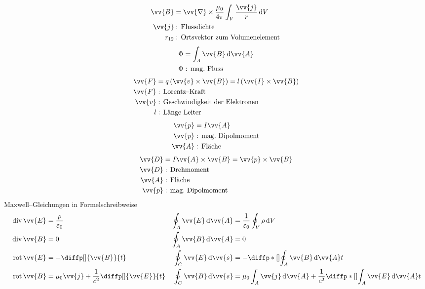 \documentclass[a4paper,12pt]{article}
\newcommand{\td}{\,\text{d}}
\numberwithin{equation}{section}
\begin{document}
\begin{align} 
        \vv{B}&=\vv{\nabla }\times \dfrac{\mu _0}{4\pi }\int_{V}^{}\dfrac{\vv{j}}{r}\td V\\
        \vv{j}&:\,\text{Flussdichte}\,\nonumber \\
        r_{12}&:\,\text{Ortsvektor zum Volumenelement}\,\nonumber 
\end{align} 
\begin{align} 
        \Phi &=\int_{A}^{}\vv{B}\td \vv{A}\\
        \Phi &:\,\text{mag.\ Fluss}\,\nonumber 
\end{align} 
\begin{align} 
        \vv{F}&=q\left(\vv{v}\times \vv{B}\right)=l\left(\vv{I}\times \vv{B}\right)\\
        \vv{F}&:\,\text{Lorentz--Kraft}\,\nonumber \\
        \vv{v}&:\,\text{Geschwindigkeit der Elektronen}\,\nonumber \\
        l&:\,\text{Länge Leiter}\,\nonumber 
\end{align} 
\begin{align} 
        \vv{p}&=I\vv{A}\\
        \vv{p}&:\,\text{mag.\ Dipolmoment}\,\nonumber \\
        \vv{A}&:\,\text{Fläche}\,\nonumber 
\end{align} 
\begin{align} 
        \vv{D}&=I\vv{A}\times \vv{B}=\vv{p}\times \vv{B}\\
        \vv{D}&:\,\text{Drehmoment}\,\nonumber \\
        \vv{A}&:\,\text{Fläche}\,\nonumber \\
        \vv{p}&:\,\text{mag.\ Dipolmoment}\,\nonumber 
\end{align} 
Maxwell--Gleichungen in Formelschreibweise
\begin{align} 
        \,\text{div}\,\vv{E}&=\dfrac{\rho }{\varepsilon _0}&\oint_{A}^{}\vv{E}\td \vv{A}&=\dfrac{1}{\varepsilon _0}\oint_{V}^{}\rho \td V\\
        \,\text{div}\,\vv{B}&=0&\oint_{A}^{}\vv{B}\td \vv{A}&=0\\
        \,\text{rot}\,\vv{E}&=-\diffp[]{\vv{B}}{t}&\oint_{C}^{}\vv{E}\td \vv{s}&=-\diffp*[]{\oint_{A}^{}\vv{B}\td \vv{A}}{t}\\
        \,\text{rot}\,\vv{B}&=\mu _0\vv{j}+\dfrac{1}{c^2}\diffp[]{\vv{E}}{t}&\oint_{C}^{}\vv{B}\td \vv{s}&=\mu _0\int_{A}^{}\vv{j}\td \vv{A}+\dfrac{1}{c^2}\diffp*[]{\int_{A}^{}\vv{E}\td \vv{A}}{t}
\end{align} 
\end{document}
